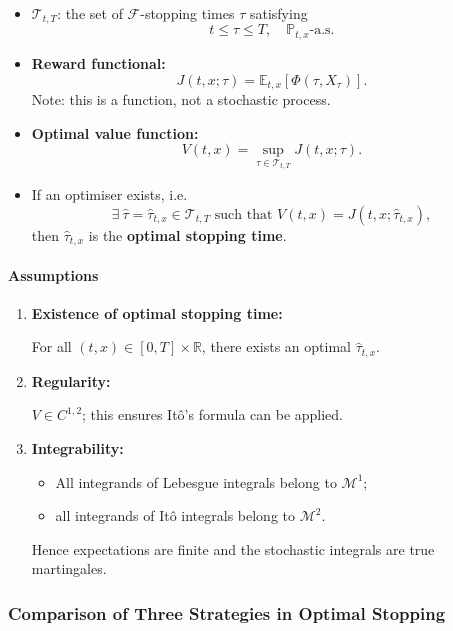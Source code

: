 \documentclass[12pt,a4paper]{article}
\theoremstyle{definition}
\newcommand{\Prob}{\mathbb{P}}
\begin{document}
\begin{itemize}
\item $\mathcal{T}_{t,T}$: the set of $\mathcal{F}$-stopping times $\tau$ satisfying
\[
t \leq \tau \leq T, \quad \Prob_{t,x}\text{-a.s.}
\]

\item \textbf{Reward functional:}
\[
J(t, x; \tau) = \mathbb{E}_{t,x}[\Phi(\tau, X_\tau)].
\]
Note: this is a function, not a stochastic process.

\item \textbf{Optimal value function:}
\[
V(t, x) = \sup_{\tau \in \mathcal{T}_{t,T}} J(t, x; \tau).
\]

\item If an optimiser exists, i.e.
\[
\exists \ \hat{\tau} = \hat{\tau}_{t,x} \in \mathcal{T}_{t,T} \text{ such that } V(t, x) = J(t, x; \hat{\tau}_{t,x}),
\]
then $\hat{\tau}_{t,x}$ is the \textbf{optimal stopping time}.
\end{itemize}

\paragraph{Assumptions}

\begin{enumerate}
\item \textbf{Existence of optimal stopping time:}

For all $(t, x) \in [0, T] \times \mathbb{R}$, there exists an optimal $\hat{\tau}_{t,x}$.

\item \textbf{Regularity:}

$V \in C^{1,2}$; this ensures Itô's formula can be applied.

\item \textbf{Integrability:}

\begin{itemize}
\item All integrands of Lebesgue integrals belong to $\mathcal{M}^1$;
\item all integrands of Itô integrals belong to $\mathcal{M}^2$.
\end{itemize}

Hence expectations are finite and the stochastic integrals are true martingales.
\end{enumerate}

\subsubsection{Comparison of Three Strategies in Optimal Stopping}
\end{document}
